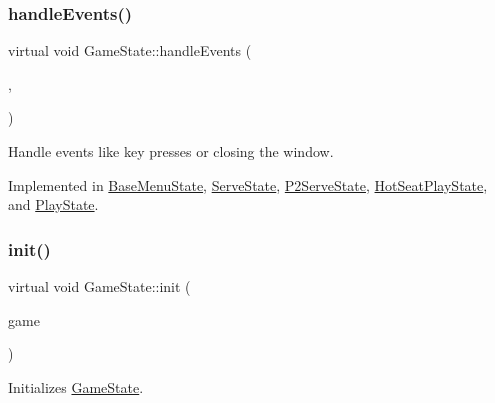 \mbox{\label{class_game_state_a3ef0638514dbfe71581d593cf0f66ce5}} 
\subsubsection{\texorpdfstring{handleEvents()}{handleEvents()}}
{\footnotesize\ttfamily virtual void Game\+State\+::handle\+Events (\begin{DoxyParamCaption}\item[{\mbox{\hyperlink{class_game_engine}{Game\+Engine}} $\ast$}]{,  }\item[{sf\+::\+Event}]{ }\end{DoxyParamCaption})\hspace{0.3cm}{\ttfamily [pure virtual]}}



Handle events like key presses or closing the window. 



Implemented in \mbox{\hyperlink{class_base_menu_state_af593c53bcd111bd210b933ddb360f509}{Base\+Menu\+State}}, \mbox{\hyperlink{class_serve_state_a8f372bdf6b72e8d4ae9eaa1b45a4d844}{Serve\+State}}, \mbox{\hyperlink{class_p2_serve_state_af7634dd3bdfca0279b5c9abc6632b2e4}{P2\+Serve\+State}}, \mbox{\hyperlink{class_hot_seat_play_state_a92606c5f4b8106b4fec1482a75be3c8d}{Hot\+Seat\+Play\+State}}, and \mbox{\hyperlink{class_play_state_acdb47d9367dac45893eb9c9a45390385}{Play\+State}}.

\mbox{\label{class_game_state_a10b6e6bb31591c70d08ffcee5f29fa81}} 
\subsubsection{\texorpdfstring{init()}{init()}}
{\footnotesize\ttfamily virtual void Game\+State\+::init (\begin{DoxyParamCaption}\item[{\mbox{\hyperlink{class_game_engine}{Game\+Engine}} $\ast$}]{game }\end{DoxyParamCaption})\hspace{0.3cm}{\ttfamily [pure virtual]}}



Initializes \mbox{\hyperlink{class_game_state}{Game\+State}}. 




